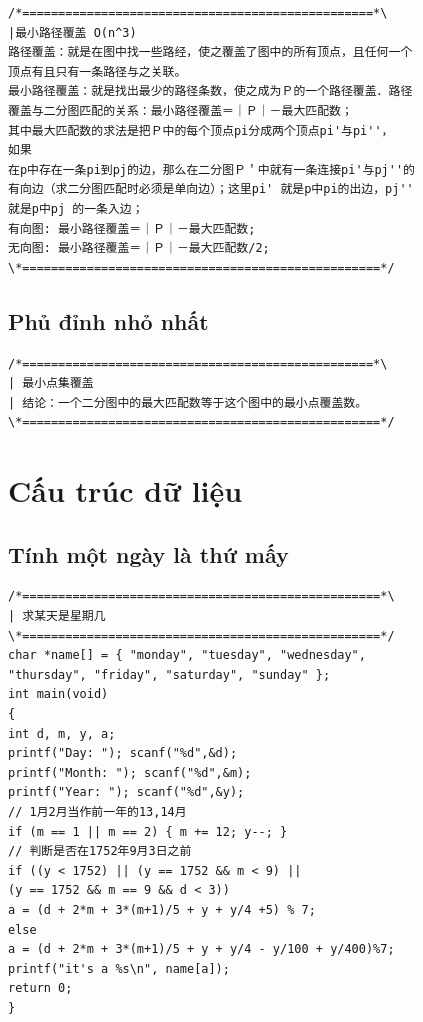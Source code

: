 \documentclass[11pt]{article}
\begin{document}
\begingroup
\scriptsize
\begin{verbatim}
/*=================================================*\
|最小路径覆盖 O(n^3)
路径覆盖：就是在图中找一些路经，使之覆盖了图中的所有顶点，且任何一个
顶点有且只有一条路径与之关联。
最小路径覆盖：就是找出最少的路径条数，使之成为Ｐ的一个路径覆盖．路径
覆盖与二分图匹配的关系：最小路径覆盖＝｜Ｐ｜－最大匹配数；
其中最大匹配数的求法是把Ｐ中的每个顶点pi分成两个顶点pi'与pi''，
如果
在p中存在一条pi到pj的边，那么在二分图Ｐ＇中就有一条连接pi'与pj''的
有向边（求二分图匹配时必须是单向边）；这里pi' 就是p中pi的出边，pj''
就是p中pj 的一条入边；
有向图: 最小路径覆盖＝｜Ｐ｜－最大匹配数;
无向图: 最小路径覆盖＝｜Ｐ｜－最大匹配数/2;
\*==================================================*/
\end{verbatim}
\endgroup

\subsection{Phủ đỉnh nhỏ nhất}

\begingroup
\scriptsize
\begin{verbatim}
/*=================================================*\
| 最小点集覆盖
| 结论：一个二分图中的最大匹配数等于这个图中的最小点覆盖数。
\*==================================================*/
\end{verbatim}
\endgroup

\section{Cấu trúc dữ liệu}

\subsection{Tính một ngày là thứ mấy}

\begingroup
\scriptsize
\begin{verbatim}
/*==================================================*\
| 求某天是星期几
\*==================================================*/
char *name[] = { "monday", "tuesday", "wednesday",
"thursday", "friday", "saturday", "sunday" };
int main(void)
{
int d, m, y, a;
printf("Day: "); scanf("%d",&d);
printf("Month: "); scanf("%d",&m);
printf("Year: "); scanf("%d",&y);
// 1月2月当作前一年的13,14月
if (m == 1 || m == 2) { m += 12; y--; }
// 判断是否在1752年9月3日之前
if ((y < 1752) || (y == 1752 && m < 9) ||
(y == 1752 && m == 9 && d < 3))
a = (d + 2*m + 3*(m+1)/5 + y + y/4 +5) % 7;
else
a = (d + 2*m + 3*(m+1)/5 + y + y/4 - y/100 + y/400)%7;
printf("it's a %s\n", name[a]);
return 0;
}
\end{verbatim}
\endgroup
\end{document}

